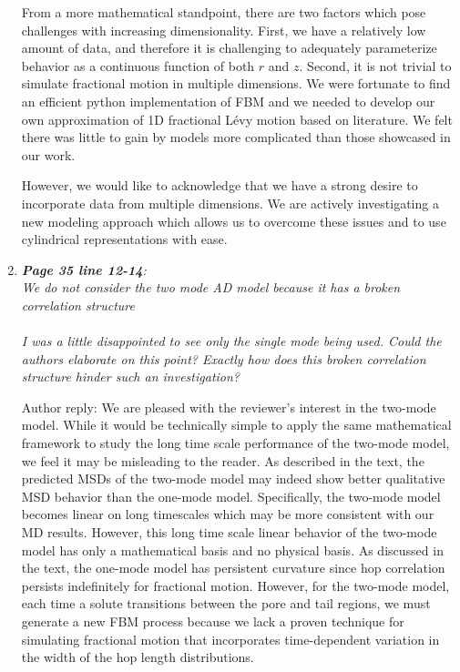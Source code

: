 \documentclass{article}
\begin{document}
\begin{enumerate}[label={Comment \theenumi :}, leftmargin=3.9\parindent]
		From a more mathematical standpoint, there are two factors which pose challenges with
		increasing dimensionality. First, we have a relatively low amount of data, and therefore
		it is challenging to adequately parameterize behavior as a continuous function of both 
		$r$ and $z$. Second, it is not trivial to simulate fractional motion in multiple dimensions.
		We were fortunate to find an efficient python implementation of FBM and we needed to
		develop our own approximation of 1D fractional L\'{e}vy motion based on literature. 
		We felt there was little to gain by models more complicated than those showcased in our
		work.
		
		However, we would like to acknowledge that we have a strong desire to incorporate data
		from multiple dimensions. We are actively investigating a new modeling approach which 
		allows us to overcome these issues and to use cylindrical representations with ease.

  \item \textit{\textbf{Page 35 line 12-14}: \\
   		We do not consider the two mode AD model because it has a broken correlation structure \\ \\
        I was a little disappointed to see only the single mode being used. Could the authors 
        elaborate on this point? Exactly how does this broken correlation structure hinder such
        an investigation?}
        
        Author reply: We are pleased with the reviewer's interest in the two-mode model. While it
        would be technically simple to apply the same mathematical framework to study the long time
        scale performance of the two-mode model, we feel it may be misleading to the reader.
        As described in the text, the predicted MSDs of the two-mode model may indeed show better 
        qualitative MSD behavior than the one-mode model. Specifically, the two-mode model becomes
        linear on long timescales which may be more consistent with our MD results. However, this 
        long time scale linear behavior of the two-mode model has only a mathematical basis and
        no physical basis. As discussed in the text, the one-mode model has persistent curvature
        since hop correlation persists indefinitely for fractional motion. However, for the two-mode
        model, each time a solute transitions between the pore and tail regions, we must generate a
        new FBM process because we lack a proven technique for simulating fractional 
        motion that incorporates time-dependent variation in the width of the hop length 
        distributions.
        

\end{enumerate}
\end{document}
